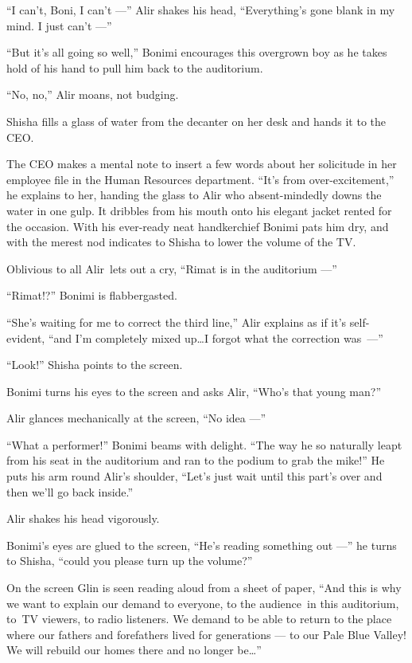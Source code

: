 \documentclass[twoside,11pt,openany]{book}
\begin{document}
``I can't, Boni, I can't ---'' Alir shakes his head, ``Everything's gone blank in my mind. I
just can't ---''

``But it's all going so well,'' Bonimi encourages this overgrown boy as he takes hold of his
hand to pull him back to the auditorium.

``No, no,'' Alir moans, not budging.

Shisha fills a glass of water from the decanter on her desk and hands it to the CEO.

The CEO makes a mental note to insert a few words about her solicitude in her employee file in the Human Resources
department.  ``It's from over-excitement,'' he explains to her, handing the glass to Alir
who absent-mindedly downs the water in one gulp. It dribbles from his mouth onto his elegant jacket rented for the
occasion.  With his ever-ready neat handkerchief Bonimi pats him dry, and with the merest nod indicates to Shisha to
lower the volume of the TV.

Oblivious to all Alir~lets out a cry, ``Rimat is in the auditorium ---''

``Rimat!?'' Bonimi is flabbergasted.

``She's waiting for me to correct the third line,'' Alir explains as if it's self-evident,
``and I'm completely mixed up{\ldots}I forgot what the correction was~---''

``Look!'' Shisha points to the screen.

Bonimi turns his eyes to the screen and asks Alir, ``Who's that young man?''

Alir glances mechanically at the screen, ``No idea ---''

``What a performer!'' Bonimi beams with delight. ``The way he so naturally leapt
from his seat in the auditorium and ran to the podium to grab the mike!'' He puts his arm round Alir's
shoulder, ``Let's just wait until this part's over and then we'll go back inside.''

Alir shakes his head vigorously.

Bonimi's eyes are glued to the screen, ``He's reading something out ---'' he turns to Shisha,
``could you please turn up the volume?''

On the screen Glin is seen reading aloud from a sheet of paper, ``And this is why we want to explain our
demand to everyone, to the audience~in this auditorium, to~TV viewers, to radio listeners. We demand to be able to
return to the place where our fathers and forefathers lived for generations --- to our Pale Blue Valley! We will rebuild
our homes there and no longer be{\ldots}''
\end{document}
